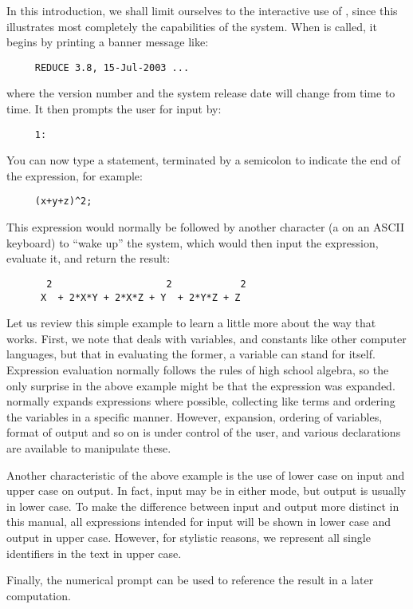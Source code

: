 In this introduction, we shall limit ourselves to the interactive use of
{\REDUCE}, since this illustrates most completely the capabilities of the
system. When {\REDUCE} is called, it begins by printing a banner message
like:
\begin{verbatim}
     REDUCE 3.8, 15-Jul-2003 ...
\end{verbatim}
where the version number and the system release date will change from time
to time. It then prompts the user for input by:
\begin{verbatim}
     1:
\end{verbatim}
You can now type a {\REDUCE} statement, terminated by a semicolon to indicate
the end of the expression, for example:
\begin{verbatim}
     (x+y+z)^2;
\end{verbatim}
This expression would normally be followed by another character (a
 on an ASCII keyboard) to ``wake up'' the system, which would
then input the expression, evaluate it, and return the result:
\begin{verbatim}
       2                    2            2
      X  + 2*X*Y + 2*X*Z + Y  + 2*Y*Z + Z
\end{verbatim}
Let us review this simple example to learn a little more about the way that
{\REDUCE} works. First, we note that {\REDUCE} deals with variables, and
constants like other computer languages, but that in evaluating the former,
a variable can stand for itself. Expression evaluation normally follows
the rules of high school algebra, so the only surprise in the above example
might be that the expression was expanded. {\REDUCE} normally expands
expressions where possible, collecting like terms and ordering the
variables in a specific manner. However, expansion, ordering of variables,
format of output and so on is under control of the user, and various
declarations are available to manipulate these.

Another characteristic of the above example is the use of lower case on
input and upper case on output.  In fact, input may be in either mode, but
output is usually in lower case.  To make the difference between input and
output more distinct in this manual, all expressions intended for input
will be shown in lower case and output in upper case.  However, for
stylistic reasons, we represent all single identifiers in the text in
upper case.

Finally, the numerical prompt can be used to reference the result in a
later computation.

